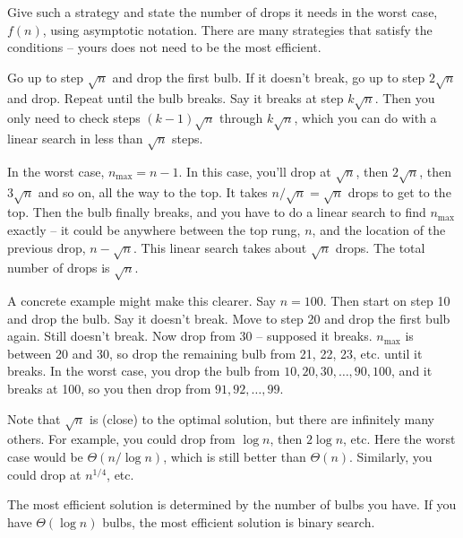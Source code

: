 \begin{prob}
    Give such a strategy and state the number of drops it needs in the worst
    case, $f(n)$, using asymptotic notation. There are many strategies that
    satisfy the conditions -- yours does not need to be the most efficient.
    
    \begin{soln}
        Go up to step $\sqrt{n}$ and drop the first bulb. If it doesn't break,
        go up to step $2\sqrt{n}$ and drop. Repeat until the bulb breaks. Say
        it breaks at step $k\sqrt{n}$. Then you only need to check steps
        $(k-1)\sqrt n$ through $k \sqrt n$, which you can do with a linear
        search in less than $\sqrt{n}$ steps.

        In the worst case, $n_\text{max} = n-1$. In this case, you'll drop
        at $\sqrt n$, then $2 \sqrt n$, then $3 \sqrt n$ and so on, all the way
        to the top. It takes $n / \sqrt{n} = \sqrt n$ drops to get to the top.
        Then the bulb finally breaks, and you have to do a linear search to
        find $n_\text{max}$ exactly -- it could be anywhere between the top
        rung, $n$, and the location of the previous drop, $n - \sqrt{n}$.
        This linear search takes about $\sqrt n$ drops.
        The total number of drops is $\sqrt n$.

        A concrete example might make this clearer. Say $n = 100$. Then
        start on step 10 and drop the bulb. Say it doesn't break. Move to step
        20 and drop the first bulb again. Still doesn't break. Now
        drop from 30 -- supposed it breaks. $n_\text{max}$ is between 20 and 30,
        so drop the remaining bulb from 21, 22, 23, etc. until it breaks. In the
        worst case, you drop the bulb from $10, 20, 30, \ldots, 90, 100$, and it
        breaks at 100, so you then drop from $91, 92, \ldots, 99$.

        Note that $\sqrt n$ is (close) to the optimal solution, but there are 
        infinitely many others. For example, you could drop from $\log n$, then $2 \log n$, etc.
        Here the worst case would be $\Theta(n / \log n)$, which is still better
        than $\Theta(n)$. Similarly, you could drop at $n^{1/4}$, etc.

        The most efficient solution is determined by the number of bulbs you
        have. If you have $\Theta(\log n)$ bulbs, the most efficient solution is
        binary search.

    \end{soln}

\end{prob}
